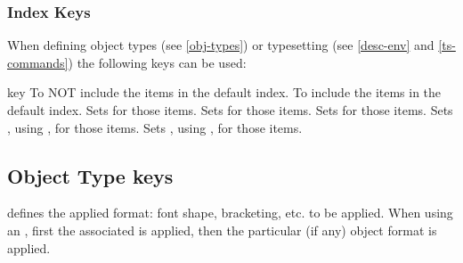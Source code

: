 \documentclass{article}
\begin{document}
\subsubsection{Index Keys}\label{index keys}
When defining object types (see \ref{obj-types}) or typesetting (see \ref{desc-env} and \ref{ts-commands}) the following keys can be used:
\begin{describelist*}{key}
   {To NOT include the items in the default index.}
   {To include the items in the default index.}
   {Sets   for those items.}
   {Sets  for those items.}
   {Sets  for those items.}  
   {Sets , using \tsobj{\indexgenkey}, for those items.}
   {Sets , using \tsobj{\indexgenkey}, for those items.}  
\end{describelist*}

\subsection{Object Type keys}\label{obj-type-def}

 defines the applied format: font shape, bracketing, etc. to be applied. When using an , first the associated  is applied, then the particular (if any) object format is applied.
\end{document}

